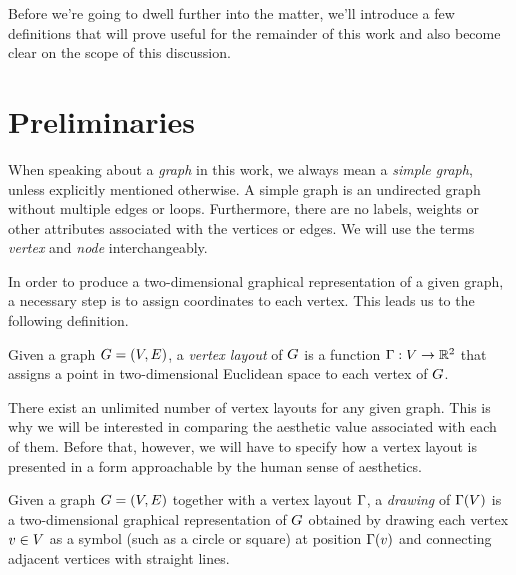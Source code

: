 \documentclass{graphstudy}
\begin{document}
Before we're going to dwell further into the matter, we'll introduce a few definitions that will prove useful for the
remainder of this work and also become clear on the scope of this discussion.

\section{Preliminaries}
\label{sec:prelim}

When speaking about a \emph{graph} in this work, we always mean a \emph{simple graph}, unless explicitly mentioned
otherwise.  A simple graph is an undirected graph without multiple edges or loops.  Furthermore, there are no labels,
weights or other attributes associated with the vertices or edges.  We will use the terms \emph{vertex} and \emph{node}
interchangeably.

In order to produce a two-dimensional graphical representation of a given graph, a necessary step is to assign
coordinates to each vertex.  This leads us to the following definition.

\begin{definition}
  Given a graph \(G=(V,E)\), a \emph{vertex layout} of \(G\) is a function
  \(\Layout:V\to\Reals^2\) that assigns a point in two-dimensional Euclidean space to each vertex of \(G\).
  \label{def:layout}
\end{definition}

There exist an unlimited number of vertex layouts for any given graph.  This is why we will be interested in comparing
the aesthetic value associated with each of them.  Before that, however, we will have to specify how a vertex layout is
presented in a form approachable by the human sense of aesthetics.

\label{def:drawing}
Given a graph \(G=(V,E)\) together with a vertex layout \(\Gamma\), a \emph{drawing} of \(\Gamma(V)\) is a
two-dimensional graphical representation of \(G\) obtained by drawing each vertex \(v\in V\) as a symbol (such
as a circle or square) at position \(\Gamma(v)\) and connecting adjacent vertices with straight lines.
\end{document}
